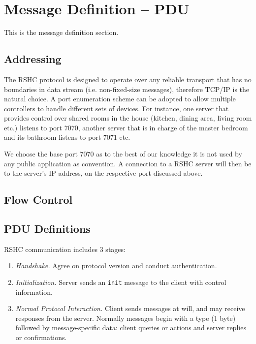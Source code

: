 \section{Message Definition -- PDU}
\label{sec:pdus}

This is the message definition section.

\subsection{Addressing}
\label{sec:pdus:addr}

The RSHC protocol is designed to operate over any reliable transport that has no boundaries in data stream (i.e. non-fixed-size messages), therefore TCP/IP is the natural choice. A port enumeration scheme can be adopted to allow multiple controllers to handle different sets of devices. For instance, one server that provides control over shared rooms in the house (kitchen, dining area, living room etc.) listens to port 7070, another server that is in charge of the master bedroom and its bathroom listens to port 7071 etc.

We choose the base port 7070 as to the best of our knowledge it is not used by any public application as convention. A connection to a RSHC server will then be to the server's IP address, on the respective port discussed above.

\subsection{Flow Control}
\label{sec:pdus:flow}



\subsection{PDU Definitions}
\label{sec:pdus:pdu}

RSHC communication includes 3 stages:

\begin{enumerate}

\item {\em Handshake.} Agree on protocol version and conduct authentication.

\item {\em Initialization.} Server sends an {\tt init} message to the client with control information.

\item {\em Normal Protocol Interaction.} Client sends messages at will, and may receive responses from the server. Normally messages begin with a type (1 byte) followed by message-specific data: client queries or actions and server replies or confirmations.

\end{enumerate}

